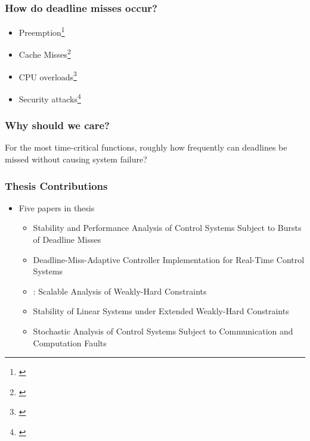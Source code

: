 \begin{frame}
    \frametitle{How do deadline misses occur?}
    \begin{itemize}\setlength\itemsep{1em}
        \item Preemption\footnote{\cite{Stankovic:1995, Bernat:2001}}
        \item Cache Misses\footnote{\cite{Milligan:1996, Wang:2012, Altmeyer:2014, Davis:2013}}
        \item CPU overloads\footnote{\cite{Baruah:1997, Xu:2015, Ernst:2014}}
        \item Security attacks\footnote{\cite{hashemi2018comparison, sabaliauskaite2017comparison, Knorn:2019}}
    \end{itemize}
\end{frame}

\begin{frame}
    \frametitle{Why should we care?}
    For the most time-critical functions, roughly how frequently can deadlines be missed without causing system failure?~\parencite{Akesson:2020}
    \begin{figure}[h]
        \centering
        
    \end{figure}
\end{frame}


\begin{frame}
    \frametitle{Thesis Contributions}
    \begin{itemize}
        \item Five papers in thesis
            \begin{itemize}
                \item Stability and Performance Analysis of Control Systems Subject to Bursts of Deadline Misses
                \item Deadline-Miss-Adaptive Controller Implementation for Real-Time Control Systems
                \item \tool{}: Scalable Analysis of Weakly-Hard Constraints
                \item Stability of Linear Systems under Extended Weakly-Hard Constraints
                \item Stochastic Analysis of Control Systems Subject to Communication and Computation Faults
            \end{itemize}
    \end{itemize}
\end{frame}
